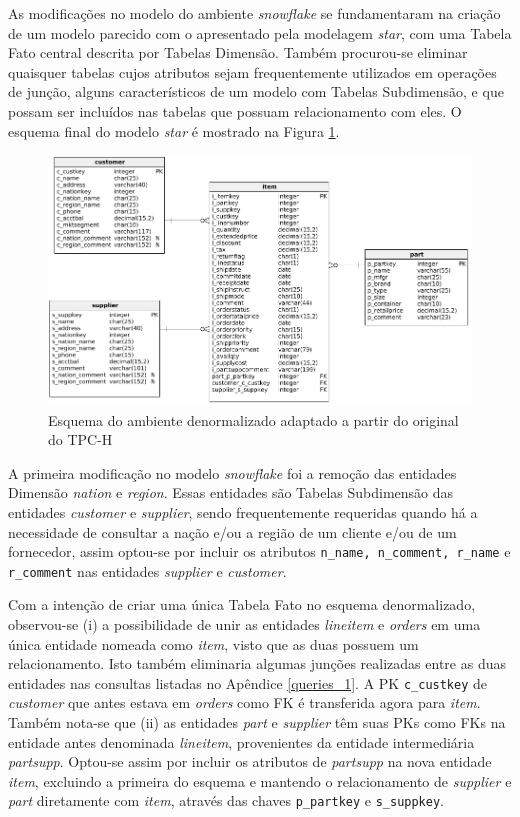 As modificações no modelo do ambiente \textit{snowflake} se fundamentaram na criação de um modelo parecido com o apresentado pela modelagem \textit{star}, com uma Tabela Fato central descrita por Tabelas Dimensão. Também procurou-se eliminar quaisquer tabelas cujos atributos sejam frequentemente utilizados em operações de junção, alguns característicos de um modelo com Tabelas Subdimensão, e que possam ser incluídos nas tabelas que possuam relacionamento com eles. O esquema final do modelo \textit{star} é mostrado na Figura \ref{fig:star}.

\begin{figure}[h]
	\centering
		\includegraphics[width=\textwidth]{img/star.png}
	\caption{Esquema do ambiente denormalizado adaptado a partir do original do TPC-H}
	\label{fig:star}
\end{figure}
 
A primeira modificação no modelo \textit{snowflake} foi a remoção das entidades Dimensão \textit{nation} e \textit{region}. Essas entidades são Tabelas Subdimensão das entidades \textit{customer} e \textit{supplier}, sendo frequentemente requeridas quando há a necessidade de consultar a nação e/ou a região de um cliente e/ou de um fornecedor, assim optou-se por incluir os atributos \texttt{n\_name, n\_comment, r\_name} e \texttt{r\_comment} nas entidades \textit{supplier} e \textit{customer}. 

Com a intenção de criar uma única Tabela Fato no esquema denormalizado, observou-se (i) a possibilidade de unir as entidades \textit{lineitem} e \textit{orders} em uma única entidade nomeada como \textit{item}, visto que as duas possuem um relacionamento. Isto também eliminaria algumas junções realizadas entre as duas entidades nas consultas listadas no Apêndice \ref{queries_1}. A PK \texttt{c\_custkey} de \textit{customer} que antes estava em \textit{orders} como FK é transferida agora para \textit{item}. Também nota-se que (ii) as entidades \textit{part} e \textit{supplier} têm suas PKs como FKs na entidade antes denominada \textit{lineitem}, provenientes da entidade intermediária \textit{partsupp}. Optou-se assim por incluir os atributos de \textit{partsupp} na nova entidade \textit{item}, excluindo a primeira do esquema e mantendo o relacionamento de \textit{supplier} e \textit{part} diretamente com \textit{item}, através das chaves \texttt{p\_partkey} e \texttt{s\_suppkey}.


